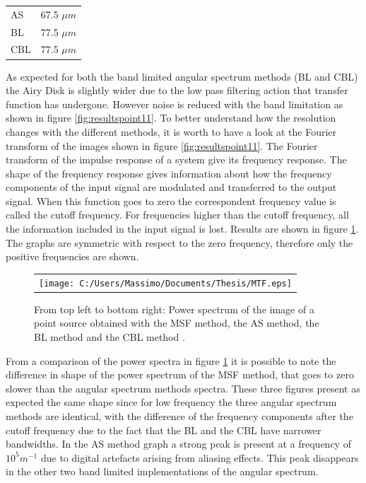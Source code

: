 	 \begin{center}
	 \begin{tabular}{ l | r }
	 	
	 	\hline			
	 	AS & 67.5 $\mu m$ \\
	 	BL & 77.5 $\mu m$ \\
	 	CBL & 77.5 $\mu m$ \\
	 	\hline 
	 		\end{tabular}
	\end{center}
	As expected for both the band limited angular spectrum methods (BL and CBL) the Airy Disk is slightly wider due to the low pass filtering action that transfer function has undergone. However noise is reduced with the band limitation as shown in figure
	 \ref{fig:resultspoint11}.
	 To better understand how the resolution changes with the different methods, it is worth to have a look at the Fourier transform of the images shown in figure \ref{fig:resultspoint11}. The Fourier transform of the impulse response of a system give its frequency response. The shape of the frequency response gives information about how the frequency components of the input signal are modulated and transferred to the output signal. When this function goes to zero the correspondent frequency value is called the cutoff frequency. For frequencies higher than the cutoff frequency, all the information included in the input signal is lost. Results are shown in figure \ref{fig:resultspoint2}. The graphs are symmetric with respect to the zero frequency, therefore only the positive frequencies are shown.
	 
	 \begin{figure}[h]
	 	\begin{center}
	 		\begin{tabular}{c}
	 			\texttt{[image: C:/Users/Massimo/Documents/Thesis/MTF.eps]}
	 		\end{tabular}
	 	\end{center}
	 	\caption{ \label{fig:resultspoint2} 
	 		From top left to bottom right: Power spectrum of the image of a point source obtained with the MSF method, the AS method, the BL method and the CBL method . }
	 \end{figure} 
	From a comparison of the power spectra in figure \ref{fig:resultspoint2} it is possible to note the difference in shape of the power spectrum of the MSF method, that goes to zero slower than the angular spectrum methods spectra. These three figures present as expected the same shape since for low frequency the three angular spectrum methods are identical, with the difference of the frequency components after the cutoff frequency due to the fact that the BL and the CBL have narrower bandwidths. In the AS method graph a strong peak is present at a frequency of $10^5 m^{-1}$ due to digital artefacts arising from aliasing effects. This peak disappears in the other two band limited implementations of the angular spectrum. 
